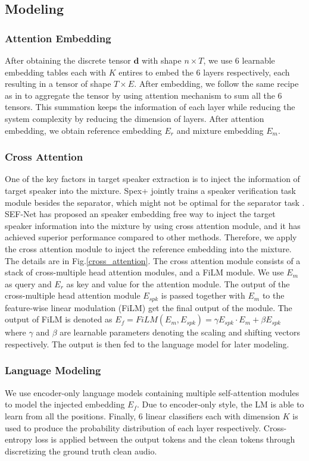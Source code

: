 \documentclass[conference]{IEEEtran}
\begin{document}
\subsection{Modeling}
\subsubsection{Attention Embedding}
After obtaining the discrete tensor \(\bm{d}\) with shape \(n\times T\), we use 6
learnable embedding tables each with \(K\) entires to embed the 6 layers 
respectively, each resulting in a tensor of shape \(T \times E\). 
After embedding, we follow the same recipe as in \cite{dasb} to 
aggregate the tensor by using attention mechanism to sum all the 6 tensors. This summation 
keeps the information of each layer while reducing the system complexity by reducing the 
dimension of layers. After attention embedding, we obtain reference embedding \(E_r\) and 
mixture embedding \(E_m\).

\subsubsection{Cross Attention}
One of the key factors in target speaker extraction is to 
inject the information of target speaker 
into the mixture. Spex+ \cite{spex_plus} jointly trains a speaker verification task module 
besides the separator, which might not be optimal for the separator task \cite{sef_net}. SEF-Net \cite{sef_net} has proposed an speaker embedding free way to inject the 
target speaker information into the mixture by using cross attention module, and it has 
achieved superior performance compared to other methods. Therefore, we apply 
the cross attention module to inject the reference embedding into the mixture. The details 
are in Fig.\ref{cross_attention}.
The cross attention module consists of a stack of cross-multiple head attention modules, 
and a FiLM module. 
We use \(E_m\) as query and \(E_r\) as key and value for 
the attention module. The output of the cross-multiple head attention module \(E_{spk}\)
is passed together with \(E_m\) to the feature-wise linear modulation (FiLM) get the final output of the module. The output of 
FiLM is denoted as \(E_f = FiLM(E_m, E_{spk}) = \gamma E_{spk} \cdot E_m  + \beta E_{spk} \) where 
\(\gamma\) and \(\beta\) are learnable parameters denoting the scaling and shifting vectors 
respectively. The output is then fed to the language model for later modeling.  
\subsubsection{Language Modeling}
We use encoder-only language models containing multiple self-attention modules to model the injected 
embedding \(E_f\). Due to encoder-only style, the LM is able to learn from all the positions. 
Finally, 6 linear classifiers each with dimension \(K\) is used to produce the probability 
distribution of each layer respectively.
Cross-entropy loss is applied between 
the output tokens and the clean tokens through discretizing the 
ground truth clean audio.
\end{document}
